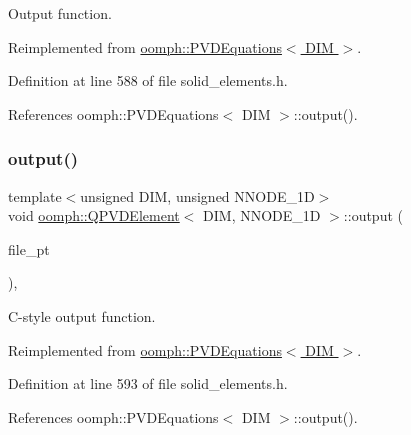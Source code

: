 Output function. 



Reimplemented from \hyperlink{classoomph_1_1PVDEquations_a5e3a09d059ced1ee9f9e1a7923171ab7}{oomph\+::\+P\+V\+D\+Equations$<$ D\+I\+M $>$}.



Definition at line 588 of file solid\+\_\+elements.\+h.



References oomph\+::\+P\+V\+D\+Equations$<$ D\+I\+M $>$\+::output().

\mbox{\label{classoomph_1_1QPVDElement_a5955081a120c29aafbfc23a3b40b0c12}} 
\subsubsection{\texorpdfstring{output()}{output()}\hspace{0.1cm}{\footnotesize\ttfamily [3/4]}}
{\footnotesize\ttfamily template$<$unsigned D\+IM, unsigned N\+N\+O\+D\+E\+\_\+1D$>$ \\
void \hyperlink{classoomph_1_1QPVDElement}{oomph\+::\+Q\+P\+V\+D\+Element}$<$ D\+IM, N\+N\+O\+D\+E\+\_\+1D $>$\+::output (\begin{DoxyParamCaption}\item[{F\+I\+LE $\ast$}]{file\+\_\+pt }\end{DoxyParamCaption})\hspace{0.3cm}{\ttfamily [inline]}, {\ttfamily [virtual]}}



C-\/style output function. 



Reimplemented from \hyperlink{classoomph_1_1PVDEquations_ae5cf4a0254fbb7db5d255db69cfb810e}{oomph\+::\+P\+V\+D\+Equations$<$ D\+I\+M $>$}.



Definition at line 593 of file solid\+\_\+elements.\+h.



References oomph\+::\+P\+V\+D\+Equations$<$ D\+I\+M $>$\+::output().

\mbox{\label{classoomph_1_1QPVDElement_a063b9d709dc2476ed53c9a6ca7d7af22}} 
